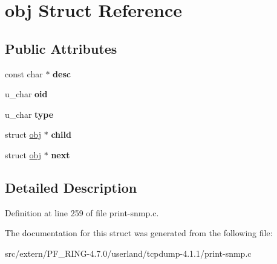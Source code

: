 \hypertarget{structobj}{
\section{obj Struct Reference}
\label{structobj}
}
\subsection*{Public Attributes}
\begin{DoxyCompactItemize}
\item 
\hypertarget{structobj_ae9b0e669474ef12f2e289c61b1cf498a}{
const char $\ast$ {\bfseries desc}}
\label{structobj_ae9b0e669474ef12f2e289c61b1cf498a}

\item 
\hypertarget{structobj_aa4dbf8d18d7786ef6e7282910aed9ca5}{
u\_\-char {\bfseries oid}}
\label{structobj_aa4dbf8d18d7786ef6e7282910aed9ca5}

\item 
\hypertarget{structobj_af17db4bd0f6a3d6ae48bf4beb42a1abe}{
u\_\-char {\bfseries type}}
\label{structobj_af17db4bd0f6a3d6ae48bf4beb42a1abe}

\item 
\hypertarget{structobj_a9a4ac88cbcd00342ba9879d600d19661}{
struct \hyperlink{structobj}{obj} $\ast$ {\bfseries child}}
\label{structobj_a9a4ac88cbcd00342ba9879d600d19661}

\item 
\hypertarget{structobj_a69da2e4d34fdb347daae61a0e6aa900a}{
struct \hyperlink{structobj}{obj} $\ast$ {\bfseries next}}
\label{structobj_a69da2e4d34fdb347daae61a0e6aa900a}

\end{DoxyCompactItemize}


\subsection{Detailed Description}


Definition at line 259 of file print-\/snmp.c.



The documentation for this struct was generated from the following file:\begin{DoxyCompactItemize}
\item 
src/extern/PF\_\-RING-\/4.7.0/userland/tcpdump-\/4.1.1/print-\/snmp.c\end{DoxyCompactItemize}

